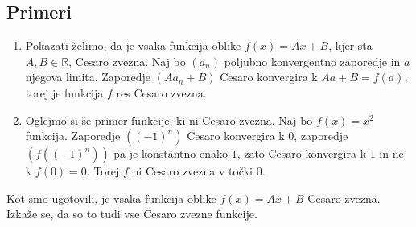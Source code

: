 \documentclass[a4paper,12pt]{article}
\theoremstyle{definition}
\theoremstyle{plain}
\begin{document}
\subsection*{Primeri}
\begin{enumerate}
    \item Pokazati želimo, da je vsaka funkcija oblike $f(x) = Ax + B$, kjer sta $A, B \in \mathbb{R}$, Cesaro zvezna. Naj bo $(a_n)$ poljubno konvergentno zaporedje in $a$ njegova limita. Zaporedje $(A a_n + B)$ Cesaro konvergira k $A a + B = f(a)$, torej je funkcija $f$ res Cesaro zvezna.
    \item Oglejmo si še primer funkcije, ki ni Cesaro zvezna. Naj bo $f(x) = x^2$ funkcija. Zaporedje $((-1)^n)$ Cesaro konvergira k $0$, zaporedje $(f((-1)^n))$ pa je konstantno enako $1$, zato Cesaro konvergira k $1$ in ne k $f(0) = 0$. Torej $f$ ni Cesaro zvezna v točki $0$.
\end{enumerate}

Kot smo ugotovili, je vsaka funkcija oblike $f(x) = Ax + B$ Cesaro zvezna. Izkaže se, da so to tudi vse Cesaro zvezne funkcije.
\end{document}
